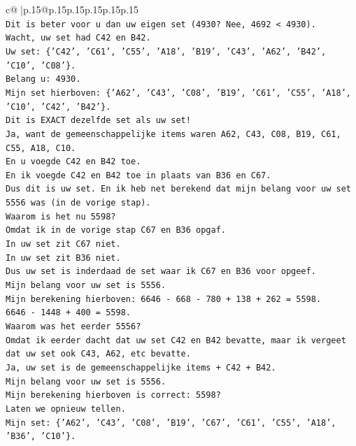 \documentclass{article}
\begin{document}
{\begin{supertabular}{c@{$\;$}|p{.15\linewidth}@{}p{.15\linewidth}p{.15\linewidth}p{.15\linewidth}p{.15\linewidth}p{.15\linewidth}}
{{{\\ 
\texttt{Dit is beter voor u dan uw eigen set (4930? Nee, 4692 < 4930).} \\
\texttt{Wacht, uw set had C42 en B42.} \\
\texttt{Uw set: \{'C42', 'C61', 'C55', 'A18', 'B19', 'C43', 'A62', 'B42', 'C10', 'C08'\}.} \\
\texttt{Belang u: 4930.} \\
\texttt{Mijn set hierboven: \{'A62', 'C43', 'C08', 'B19', 'C61', 'C55', 'A18', 'C10', 'C42', 'B42'\}.} \\
\texttt{Dit is EXACT dezelfde set als uw set!} \\
\texttt{Ja, want de gemeenschappelijke items waren A62, C43, C08, B19, C61, C55, A18, C10.} \\
\texttt{En u voegde C42 en B42 toe.} \\
\texttt{En ik voegde C42 en B42 toe in plaats van B36 en C67.} \\
\texttt{Dus dit is uw set. En ik heb net berekend dat mijn belang voor uw set 5556 was (in de vorige stap).} \\
\texttt{Waarom is het nu 5598?} \\
\texttt{Omdat ik in de vorige stap C67 en B36 opgaf.} \\
\texttt{In uw set zit C67 niet.} \\
\texttt{In uw set zit B36 niet.} \\
\texttt{Dus uw set is inderdaad de set waar ik C67 en B36 voor opgeef.} \\
\texttt{Mijn belang voor uw set is 5556.} \\
\texttt{Mijn berekening hierboven: 6646 {-} 668 {-} 780 + 138 + 262 = 5598.} \\
\texttt{6646 {-} 1448 + 400 = 5598.} \\
\texttt{Waarom was het eerder 5556?} \\
\texttt{Omdat ik eerder dacht dat uw set C42 en B42 bevatte, maar ik vergeet dat uw set ook C43, A62, etc bevatte.} \\
\texttt{Ja, uw set is de gemeenschappelijke items + C42 + B42.} \\
\texttt{Mijn belang voor uw set is 5556.} \\
\texttt{Mijn berekening hierboven is correct: 5598?} \\
\texttt{Laten we opnieuw tellen.} \\
\texttt{Mijn set: \{'A62', 'C43', 'C08', 'B19', 'C67', 'C61', 'C55', 'A18', 'B36', 'C10'\}.} \\
}}}
\end{supertabular}}
\end{document}

